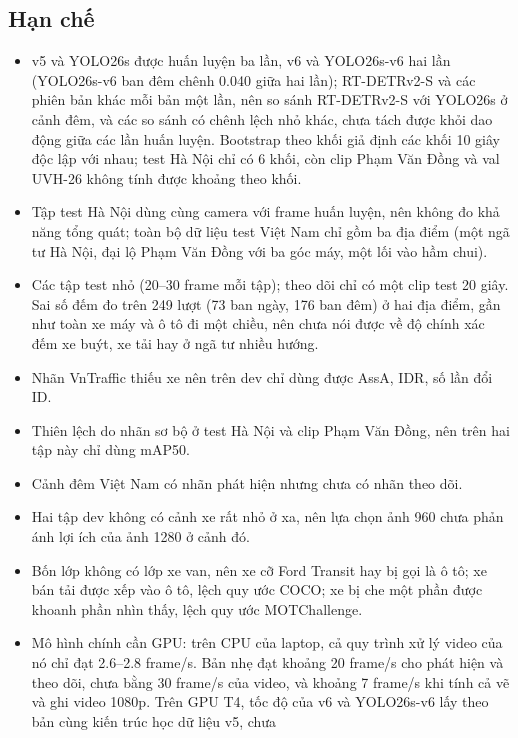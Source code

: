\subsection{Hạn chế}

\begin{itemize}
  \item v5 và YOLO26s được huấn luyện ba lần, v6 và YOLO26s-v6 hai lần (YOLO26s-v6 ban đêm chênh 0.040 giữa hai lần);
        RT-DETRv2-S và các phiên bản khác mỗi bản một lần, nên so sánh RT-DETRv2-S với YOLO26s ở cảnh đêm, và các so
        sánh có chênh lệch nhỏ khác, chưa tách được khỏi dao động giữa các lần huấn luyện. Bootstrap theo khối giả định
        các khối 10 giây độc lập với nhau; test Hà Nội chỉ có 6 khối, còn clip Phạm Văn Đồng và val UVH-26 không tính
        được khoảng theo khối.
  \item Tập test Hà Nội dùng cùng camera với frame huấn luyện, nên không đo khả năng tổng quát; toàn bộ dữ liệu test
        Việt Nam chỉ gồm ba địa điểm (một ngã tư Hà Nội, đại lộ Phạm Văn Đồng với ba góc máy, một lối vào hầm chui).
  \item Các tập test nhỏ (20--30 frame mỗi tập); theo dõi chỉ có một clip test 20 giây. Sai số đếm đo trên 249 lượt
        (73 ban ngày, 176 ban đêm) ở hai địa điểm, gần như toàn xe máy và ô tô đi một chiều, nên chưa nói được về độ
        chính xác đếm xe buýt, xe tải hay ở ngã tư nhiều hướng.
  \item Nhãn VnTraffic thiếu xe nên trên dev chỉ dùng được AssA, IDR, số lần đổi ID.
  \item Thiên lệch do nhãn sơ bộ ở test Hà Nội và clip Phạm Văn Đồng, nên trên hai tập này chỉ dùng mAP50.
  \item Cảnh đêm Việt Nam có nhãn phát hiện nhưng chưa có nhãn theo dõi.
  \item Hai tập dev không có cảnh xe rất nhỏ ở xa, nên lựa chọn ảnh 960 chưa phản ánh lợi ích của ảnh 1280 ở cảnh đó.
  \item Bốn lớp không có lớp xe van, nên xe cỡ Ford Transit hay bị gọi là ô tô; xe bán tải được xếp vào ô tô, lệch quy
        ước COCO; xe bị che một phần được khoanh phần nhìn thấy, lệch quy ước MOTChallenge.
  \item Mô hình chính cần GPU: trên CPU của laptop, cả quy trình xử lý video của nó chỉ đạt 2.6--2.8 frame/s. Bản nhẹ
        đạt khoảng 20 frame/s cho phát hiện và theo dõi, chưa bằng 30 frame/s của video, và khoảng 7 frame/s khi tính cả
        vẽ và ghi video 1080p. Trên GPU T4, tốc độ của v6 và YOLO26s-v6 lấy theo bản cùng kiến trúc học dữ liệu v5, chưa

\end{itemize}
